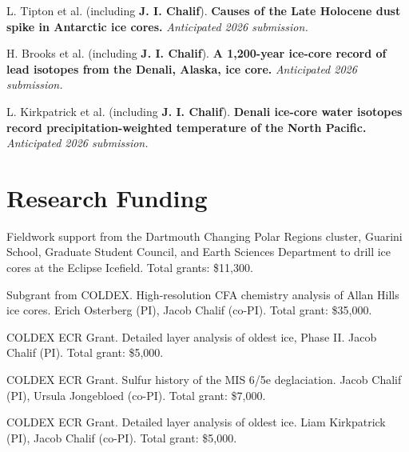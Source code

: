 \documentclass[a4paper,11pt]{article}
\begin{document}
\begin{enumerate}[leftmargin=*, labelsep=0.5em, align=left, widest={[\textbf{S.1}]}, itemindent=0em, label={\textbf{[\arabic*]}]
\item[\textbf{P26}] L. Tipton et al. (including \textbf{J. I. Chalif}). \textbf{Causes of the Late Holocene dust spike in Antarctic ice cores.} \textit{Anticipated 2026 submission.}

\item[\textbf{P26}] H. Brooks et al. (including \textbf{J. I. Chalif}). \textbf{A 1,200-year ice-core record of lead isotopes from the Denali, Alaska, ice core.} \textit{Anticipated 2026 submission.}

\item[\textbf{P26}] L. Kirkpatrick et al. (including \textbf{J. I. Chalif}). \textbf{Denali ice-core water isotopes record precipitation-weighted temperature of the North Pacific.} \textit{Anticipated 2026 submission.}

\end{enumerate}


\section{\textbf{Research Funding}}
\begin{enumerate}[leftmargin=*, labelsep=0.5em, align=left, widest={[\textbf{S.1}]}, itemindent=0em, label={\textbf{[\arabic*]}]}]
\item[\textbf{2026}] Fieldwork support from the Dartmouth Changing Polar Regions cluster, Guarini School, Graduate Student Council, and Earth Sciences Department to drill ice cores at the Eclipse Icefield. Total grants: \$11,300.

\item[\textbf{2025}] Subgrant from COLDEX. High-resolution CFA chemistry analysis of Allan Hills ice cores. Erich Osterberg (PI), Jacob Chalif (co-PI). Total grant: \$35,000.

\item[\textbf{2024}] COLDEX ECR Grant. Detailed layer analysis of oldest ice, Phase II. Jacob Chalif (PI). Total grant: \$5,000.

\item[\textbf{2024}] COLDEX ECR Grant. Sulfur history of the MIS 6/5e deglaciation. Jacob Chalif (PI), Ursula Jongebloed (co-PI). Total grant: \$7,000.

\item[\textbf{2023}] COLDEX ECR Grant. Detailed layer analysis of oldest ice. Liam Kirkpatrick (PI), Jacob Chalif (co-PI). Total grant: \$5,000.
\end{enumerate}
\end{document}
